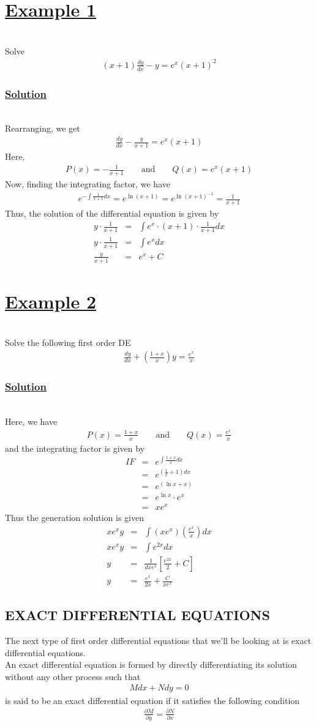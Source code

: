 \documentclass[11pt]{report}
\newcommand{\ubt}[1]{\textbf{\underline{#1}}}
\newcommand{\sps}{\\[0.2cm]}
\newcommand{\spn}[1]{\\[#1cm]}
\newcommand{\example}[1]{\section*{\ubt{Example #1}}{~}\spn{-1}}
\newcommand{\solution}{\subsubsection{\ubt{Solution}}{~}\spn{-1}}
\begin{document}
	\example{1}
	Solve
	\begin{eqnarray*}
		(x+1)\frac{dy}{dx} - y = e^{x}(x+1)^2
	\end{eqnarray*}
	
	\solution
	Rearranging, we get
	\begin{eqnarray*}
		\frac{dy}{dx}  - \frac{y}{x+1} = e^{x}(x+1)
	\end{eqnarray*}
	Here,
	\begin{eqnarray*}
		P(x) = -\frac{1}{x+1} \qquad \text{and}\qquad Q(x) = e^x(x+1)
	\end{eqnarray*}
	Now, finding the integrating factor, we have
	\begin{eqnarray*}
		e^{-\int\frac{1}{x+1}dx} = e^{\ln(x+1)} = e^{\ln(x+1)^{-1}} = \frac{1}{x+1}
	\end{eqnarray*}
	Thus, the solution of the differential equation is given by
	\begin{eqnarray*}
		y \cdot \frac{1}{x+1} &=& \int e^x \cdot (x+1) \cdot \frac{1}{x+1} dx\sps
		y \cdot \frac{1}{x+1} &=& \int e^x dx\sps
		\frac{y}{x+1} &=& e^x + C 
	\end{eqnarray*}
	
	\example{2}
	Solve the following first order DE
	\begin{eqnarray*}
		\frac{dy}{dx} +\left(\frac{1+x}{x}\right)y = \frac{e^x}{x}
	\end{eqnarray*}
	
	\solution
	Here, we have
	\begin{eqnarray*}
		P(x) = \frac{1+x}{x}\qquad \text{and}\qquad Q(x) = \frac{e^x}{x}
	\end{eqnarray*}
	and the integrating factor is given by
	\begin{eqnarray*}
		IF &=& e^{\int\frac{1+x}{x}dx}\\
		&=& e^{\left(\frac{1}{x} + 1\right)dx}\\\
		&=& e^{(\ln x + x)}\\
		&=& e^{\ln x} \cdot e^{x}\\
		&=& xe^x
	\end{eqnarray*}
	Thus the generation solution is given 
	\begin{eqnarray*}
		xe^xy &=& \int(xe^x)\left(\frac{e^x}{x}\right)dx\sps
		xe^xy &=& \int e^{2x}dx\sps
		y &=& \frac{1}{dxe^x}\left[\frac{e^{2x}}{2} + C\right]\sps
		y &=& \frac{e^x}{2x} + \frac{C}{xe^x}
	\end{eqnarray*}
	
	\subsection{EXACT DIFFERENTIAL EQUATIONS}
	The next type of first order differential equations that we’ll be looking at is exact differential equations.\sps
	An exact differential equation is formed by directly differentiating its solution without any other process such that
	\begin{eqnarray}
		Mdx + Ndy = 0
	\end{eqnarray}
	is said to be an exact differential equation if it satisfies the following condition
	\begin{eqnarray}
		\frac{\partial M}{\partial y} = \frac{\partial N}{\partial x}
	\end{eqnarray}
\end{document}
